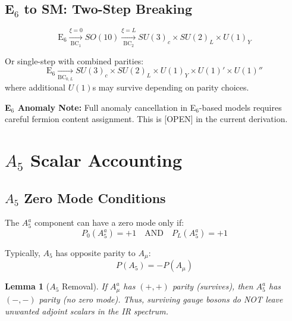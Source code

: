 \documentclass[11pt,a4paper]{article}
\newtheorem{lemma}[theorem]{Lemma}
\begin{document}
\subsection{E$_6$ to SM: Two-Step Breaking}

\begin{equation}
  \text{E}_6 \xrightarrow[\text{BC}_1]{\xi=0} SO(10)
    \xrightarrow[\text{BC}_2]{\xi=L} SU(3)_c \times SU(2)_L \times U(1)_Y
  \label{eq:e6-two-step}
\end{equation}

Or single-step with combined parities:
\begin{equation}
  \text{E}_6 \xrightarrow[\text{BC}_{0,L}]{} SU(3)_c \times SU(2)_L \times U(1)_Y
    \times U(1)' \times U(1)''
  \label{eq:e6-single-step}
\end{equation}
where additional $U(1)$s may survive depending on parity choices.

\begin{openitembox}
\textbf{E$_6$ Anomaly Note:} Full anomaly cancellation in E$_6$-based models requires
careful fermion content assignment. This is [OPEN] in the current derivation.
\end{openitembox}

\section{$A_5$ Scalar Accounting}
\label{sec:a5-scalar}

\subsection{$A_5$ Zero Mode Conditions}

The $A_5^a$ component can have a zero mode only if:
\begin{equation}
  P_0(A_5^a) = +1 \quad \text{AND} \quad P_L(A_5^a) = +1
  \label{eq:a5-zero-condition}
\end{equation}

Typically, $A_5$ has opposite parity to $A_\mu$:
\begin{equation}
  P(A_5) = -P(A_\mu)
  \label{eq:a5-parity-opposite}
\end{equation}

\begin{lemma}[$A_5$ Removal]
\label{lem:a5-removal-lemma}
If $A_\mu^a$ has $(+,+)$ parity (survives), then $A_5^a$ has $(-,-)$ parity
(no zero mode). Thus, surviving gauge bosons do NOT leave unwanted adjoint
scalars in the IR spectrum.
\end{lemma}
\end{document}

